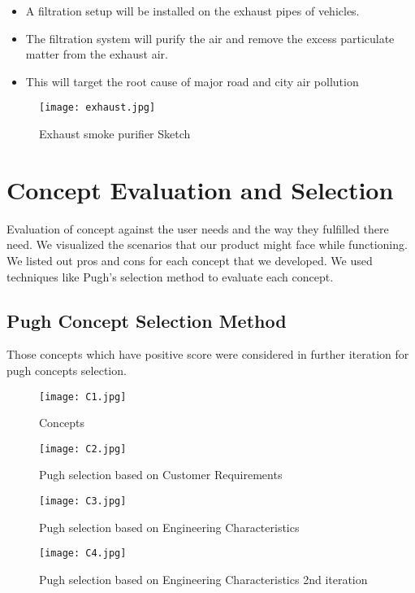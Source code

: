 \documentclass[12pt]{article}
\begin{document}
\begin{itemize}
\item A filtration setup will be installed on the exhaust pipes of vehicles.
\item The filtration system will purify the air and remove the excess particulate matter from the exhaust air.
\item This will target the root cause of major road and city air pollution
\end{itemize}

\begin{figure}[!htb]
\centering
\texttt{[image: exhaust.jpg]}
\caption{\label{fig:}Exhaust smoke purifier Sketch}
\end{figure}

\newpage

\section{Concept Evaluation and Selection}

Evaluation of concept against the user needs and the way they fulfilled there need. We visualized the scenarios that our product might face while functioning. We listed out pros and cons for each concept that we developed. We used techniques like Pugh's selection method to evaluate each concept.

\subsection{Pugh Concept Selection Method}

Those concepts which have positive score were considered in further iteration for pugh concepts selection. 

\begin{figure}[!htb]
\centering
\texttt{[image: C1.jpg]}
\caption{\label{fig:}Concepts}
\end{figure}

\begin{figure}[!htb]
\centering
\texttt{[image: C2.jpg]}
\caption{\label{fig:}Pugh selection based on Customer Requirements}
\end{figure}

\begin{figure}[!htb]
\centering
\texttt{[image: C3.jpg]}
\caption{\label{fig:}Pugh selection based on Engineering Characteristics}
\end{figure}

\begin{figure}[!htb]
\centering
\texttt{[image: C4.jpg]}
\caption{\label{fig:}Pugh selection based on Engineering Characteristics 2nd iteration}
\end{figure}
\end{document}
